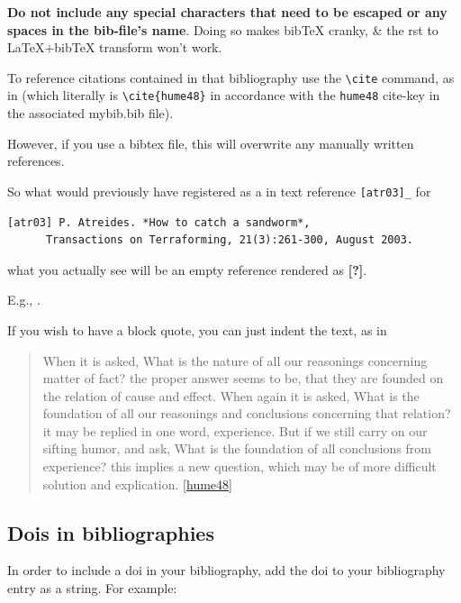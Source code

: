 \documentclass[letterpaper,compsoc,twoside,onecolumn]{IEEEtran}
\begin{document}
\textbf{Do not include any special characters that need to be escaped or
any spaces in the bib-file's name}. Doing so makes
bibTeX cranky, \& the rst to LaTeX+bibTeX transform
won't work.

To reference citations contained in that bibliography use the
\texttt{\textbackslash cite} command, as in \cite{hume48}
(which literally is \texttt{\textbackslash cite\{hume48\}} in
accordance with the \texttt{hume48} cite-key in the associated mybib.bib
file).

However, if you use a bibtex file, this will overwrite any manually
written references.

So what would previously have registered as a in text reference
\texttt{{[}atr03{]}\_} for

\begin{verbatim}
[atr03] P. Atreides. *How to catch a sandworm*,
      Transactions on Terraforming, 21(3):261-300, August 2003.
\end{verbatim}

what you actually see will be an empty reference rendered as
\textbf{{[}?{]}}.

E.g., \cite{atr03}.

If you wish to have a block quote, you can just indent the text, as in

\begin{quote}
When it is asked, What is the nature of all our reasonings concerning
matter of fact? the proper answer seems to be, that they are founded on
the relation of cause and effect. When again it is asked, What is the
foundation of all our reasonings and conclusions concerning that
relation? it may be replied in one word, experience. But if we still
carry on our sifting humor, and ask, What is the foundation of all
conclusions from experience? this implies a new question, which may be
of more difficult solution and explication.
\protect\hyperlink{hume48}{{[}hume48{]}}
\end{quote}

\hypertarget{dois-in-bibliographies}{%
\subsection{Dois in bibliographies}\label{dois-in-bibliographies}}

In order to include a doi in your bibliography, add the doi to your
bibliography entry as a string. For example:

\begin{Shaded}
\begin{Highlighting}[]
\NormalTok{\}}
\end{Highlighting}
\end{Shaded}
\end{document}
